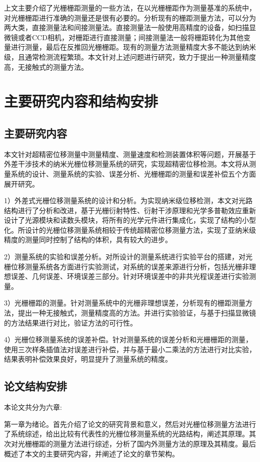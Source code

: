 \documentclass[type=master,oneside]{fduthesis}
\begin{document}
上文主要介绍了光栅栅距测量的一些方法，在以光栅栅距作为测量基准的系统中，对光栅栅距进行准确的测量还是很有必要的。分析现有的栅距测量方法，可以分为两大类，直接测量法和间接测量法。直接测量法一般使用高精度的设备，如扫描显微镜或者CCD相机，对栅距进行直接测量；间接测量法一般将栅距转化为其他变量进行测量，最后在反推回光栅栅距。现有的测量方法测量精度大多不能达到纳米级，且通常检测流程繁琐。本文针对上述问题进行研究，致力于提出一种测量精度高，无接触式的测量方法。



\section{主要研究内容和结构安排}
\subsection{主要研究内容}
本文针对超精密位移测量中测量精度、测量速度和检测装置体积等问题，开展基于外差干涉技术的纳米光栅位移测量系统的研究，实现超精密位移检测。本文将从测量系统的设计、测量系统的实验、误差分析、光栅栅距的测量和误差补偿五个方面展开研究。

1）外差式光栅位移测量系统的设计和分析。为实现纳米级位移检测，本文对光路结构进行了分析和改进，基于光栅衍射特性、衍射干涉原理和光学多普勒效应重新设计了光源模块和读数头模块，将所有的光学元件进行集成化，实现了结构的小型化。所设计的光栅位移测量系统相较于传统超精密位移测量方法，实现了亚纳米级精度的测量同时控制了结构的体积，具有较大的进步。

2）测量系统的实验和误差分析。对所设计的测量系统进行实验平台的搭建，对光栅位移测量系统各方面进行实验测试，对系统的误差来源进行分析，包括光栅非理想误差、几何误差、环境误差三部分。针对环境误差中的非共光程误差进行实验测量。

3）光栅栅距的测量。针对测量系统中的光栅非理想误差，分析现有的栅距测量方法，提出一种无接触式，测量精度高的方法。并进行实验验证，与基于扫描显微镜的方法结果进行对比，验证方法的可行性。

4）光栅位移测量系统的误差补偿。针对测量系统的误差分析和光栅栅距的测量，使用三次样条插值法对误差进行补偿，并与基于最小二乘法的方法进行对比实验，结果表明补偿效果良好，明显提升了测量系统的精度。


\subsection{论文结构安排}
本论文共分为六章:

第一章为绪论。首先介绍了论文的研究背景和意义，然后对光栅位移测量方法进行了系统综述，给出比较有代表性的光栅位移测量系统的光路结构，阐述其原理。其次对光栅栅距的测量方法进行综述，分析了国内外测量方法的原理及其精度。最后概述了本文的主要研究内容，并阐述了论文的章节架构。
\end{document}
